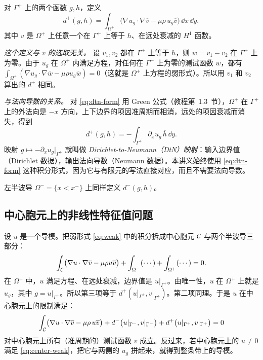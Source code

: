 \documentclass[11pt,a4paper,fontset=fandol]{ctexart}
\begin{document}
对 $\Gamma^+$ 上的两个函数 $g,h$，定义
\begin{equation}
\label{eq:dtn-form}
d^+(g,h)=\int_{\Omega^+}\bigl(\nabla u_g\cdot\nabla\overline v-\mu\rho\,u_g\overline v\bigr)\,\dd x\,\dd y ,
\end{equation}
其中 $v$ 是 $\Omega^+$ 上任意一个在 $\Gamma^+$ 上等于 $h$、在远处衰减的 $H^1$ 函数。

\emph{这个定义与 $v$ 的选取无关。} 设 $v_1,v_2$ 都在 $\Gamma^+$ 上等于 $h$，则 $w=v_1-v_2$ 在 $\Gamma^+$ 上为零。由于 $u_g$ 在 $\Omega^+$ 内满足方程，对任何在 $\Gamma^+$ 上为零的测试函数 $w$，都有 $\int_{\Omega^+}(\nabla u_g\cdot\nabla\overline w-\mu\rho u_g\overline w)=0$（这就是 $\Omega^+$ 上方程的弱形式）。所以用 $v_1$ 和 $v_2$ 算出的 $d^+$ 相同。

\emph{与法向导数的关系。} 对 \eqref{eq:dtn-form} 用 Green 公式（教程第~1.3~节），$\Omega^+$ 在 $\Gamma^+$ 上的外法向是 $-x$ 方向，上下边界的项因准周期而相消，远处的项因衰减而消失，得到
\[
d^+(g,h)=-\int_{\Gamma^+}\partial_xu_g\,\overline h\,\dd y .
\]
映射 $g\mapsto-\partial_xu_g|_{\Gamma^+}$ 就叫做 \emph{Dirichlet-to-Neumann（DtN）映射}：输入边界值（Dirichlet 数据），输出法向导数（Neumann 数据）。本讲义始终使用 \eqref{eq:dtn-form} 这种积分形式，因为它与有限元的写法直接对应，而且不需要法向导数。

左半波导 $\Omega^-=\{x<x^-\}$ 上同样定义 $d^-(g,h)$。

\subsection{中心胞元上的非线性特征值问题}

设 $u$ 是一个导模。把弱形式 \eqref{eq:weak} 中的积分拆成中心胞元 $\mathcal C$ 与两个半波导三部分：
\[
\int_{\mathcal C}\bigl(\nabla u\cdot\nabla\overline v-\mu\rho u\overline v\bigr)+\int_{\Omega^-}(\cdots)+\int_{\Omega^+}(\cdots)=0 .
\]
在 $\Omega^+$ 中，$u$ 满足方程、在远处衰减，边界值是 $u|_{\Gamma^+}$。由唯一性，$u$ 在 $\Omega^+$ 上就是 $u_g$，其中 $g=u|_{\Gamma^+}$。所以第三项等于 $d^+(u|_{\Gamma^+},v|_{\Gamma^+})$。第二项同理。于是 $u$ 在中心胞元上的限制满足：
\begin{equation}
\label{eq:center-weak}
\int_{\mathcal C}\bigl(\nabla u\cdot\nabla\overline v-\mu\rho\,u\overline v\bigr)+d^-\bigl(u|_{\Gamma^-},v|_{\Gamma^-}\bigr)+d^+\bigl(u|_{\Gamma^+},v|_{\Gamma^+}\bigr)=0
\end{equation}
对中心胞元上所有（准周期的）测试函数 $v$ 成立。反过来，若中心胞元上的 $u\ne0$ 满足 \eqref{eq:center-weak}，把它与两侧的 $u_g$ 拼起来，就得到整条带上的导模。
\end{document}
